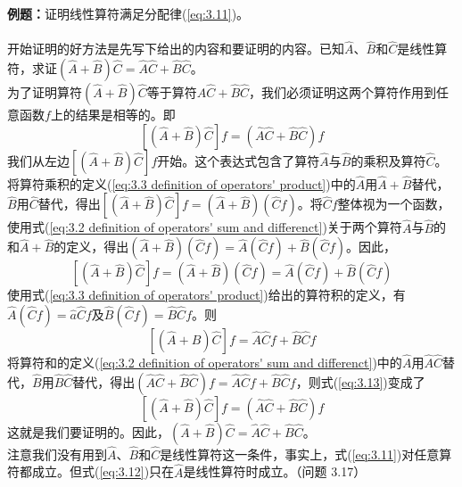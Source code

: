 	\begin{examplebox}
		\textbf{例题：}证明线性算符满足分配律(\ref{eq:3.11})。\\
		\\
		\indent 开始证明的好方法是先写下给出的内容和要证明的内容。已知$\hat{A}$、$\hat{B}$和$\hat{C}$是线性算符，求证$\left(\hat{A}+\hat{B}\right)\hat{C} = \hat{A}\hat{C}+\hat{B}\hat{C}$。\\
		为了证明算符$\left(\hat{A}+\hat{B}\right)\hat{C}$等于算符$\hat{A}\hat{C}+\hat{B}\hat{C}$，我们必须证明这两个算符作用到任意函数$f$上的结果是相等的。即
		\begin{equation*}
			\left[\left(\hat{A}+\hat{B}\right)\hat{C}\right]f = \left(\hat{A}\hat{C}+\hat{B}\hat{C}\right)f
		\end{equation*}
		我们从左边$\left[\left(\hat{A}+\hat{B}\right)\hat{C}\right]f$开始。这个表达式包含了算符$\hat{A}$与$\hat{B}$的乘积及算符$\hat{C}$。将算符乘积的定义(\ref{eq:3.3 definition of operators' product})中的$\hat{A}$用$\hat{A}+\hat{B}$替代，$\hat{B}$用$\hat{C}$替代，得出$\left[\left(\hat{A}+\hat{B}\right)\hat{C}\right]f = \left(\hat{A}+\hat{B}\right)\left(\hat{C}f\right)$。将$\hat{C}f$整体视为一个函数，使用式(\ref{eq:3.2 definition of operators' sum and differenct})关于两个算符$\hat{A}$与$\hat{B}$的和$\hat{A}+\hat{B}$的定义，得出$\left(\hat{A}+\hat{B}\right)\left(\hat{C}f\right) = \hat{A}\left(\hat{C}f\right)+\hat{B}\left(\hat{C}f\right)$。因此，
		\begin{equation*}
			\left[\left(\hat{A}+\hat{B}\right)\hat{C}\right]f = \left(\hat{A}+\hat{B}\right)\left(\hat{C}f\right) = \hat{A}\left(\hat{C}f\right)+\hat{B}\left(\hat{C}f\right)
		\end{equation*}
		使用式(\ref{eq:3.3 definition of operators' product})给出的算符积的定义，有$\hat{A}\left(\hat{C}f\right) = \hat{a}\hat{C}f$及$\hat{B}\left(\hat{C}f\right) = \hat{B}\hat{C}f$。则
		\begin{equation}
			\left[\left(\hat{A}+\hat{B}\right)\hat{C}\right]f = \hat{A}\hat{C}f+\hat{B}\hat{C}f
			\label{eq:3.13}
		\end{equation}
		将算符和的定义(\ref{eq:3.2 definition of operators' sum and differenct})中的$\hat{A}$用$\hat{A}\hat{C}$替代，$\hat{B}$用$\hat{B}\hat{C}$替代，得出$\left(\hat{A}\hat{C}+\hat{B}\hat{C}\right)f = \hat{A}\hat{C}f+\hat{B}\hat{C}f$，则式(\ref{eq:3.13})变成了
		\begin{equation*}
			\left[\left(\hat{A}+\hat{B}\right) \hat{C}\right]f = \left(\hat{A}\hat{C}+\hat{B}\hat{C}\right)f
		\end{equation*}
		这就是我们要证明的。因此，$\left(\hat{A}+\hat{B}\right)\hat{C} = \hat{A}\hat{C}+\hat{B}\hat{C}$。\\
		注意我们没有用到$\hat{A}$、$\hat{B}$和$\hat{C}$是线性算符这一条件，事实上，式(\ref{eq:3.11})对任意算符都成立。但式(\ref{eq:3.12})只在$\hat{A}$是线性算符时成立。（问题 3.17）
	\end{examplebox}
